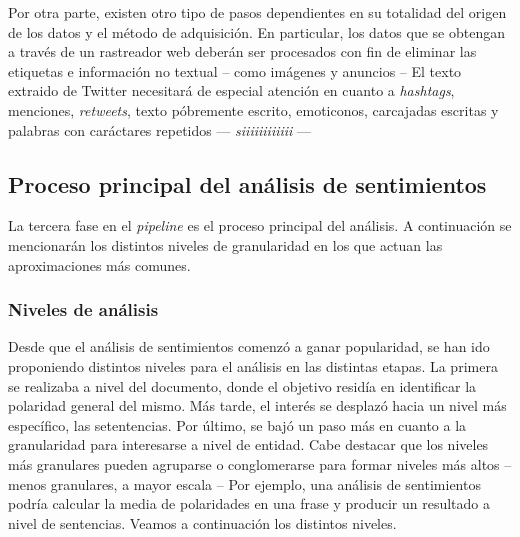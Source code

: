 Por otra parte, existen otro tipo de pasos dependientes en su totalidad del
origen de los datos y el método de adquisición. En particular, los datos que se
obtengan a través de un rastreador web deberán ser procesados con fin de
eliminar las etiquetas  e información no textual -- como
imágenes y anuncios -- El texto extraido de Twitter necesitará de especial
atención en cuanto a \emph{hashtags}, menciones, \emph{retweets}, texto
póbremente escrito, emoticonos, carcajadas escritas y palabras con caráctares
repetidos --- \emph{siiiiiiiiiiii} ---

\subsection{Proceso principal del análisis de sentimientos}
\label{sec:omcore}

La tercera fase en el \emph{pipeline} es el proceso principal del análisis. A
continuación se mencionarán los distintos niveles de granularidad en los que
actuan las aproximaciones más comunes.

\subsubsection{Niveles de análisis}
\label{sec:anallevels}

Desde que el análisis de sentimientos comenzó a ganar popularidad, se han ido
proponiendo distintos niveles para el análisis en las distintas etapas. La
primera se realizaba a nivel del documento, donde el objetivo residía en
identificar la polaridad general del mismo. Más tarde, el interés se desplazó
hacia un nivel más específico, las setentencias. Por último, se bajó un paso más
en cuanto a la granularidad para interesarse a nivel de entidad. Cabe destacar
que los niveles más granulares pueden agruparse o conglomerarse para formar
niveles más altos -- menos granulares, a mayor escala -- Por ejemplo, una
análisis de sentimientos podría calcular la media de polaridades en una frase y
producir un resultado a nivel de sentencias. Veamos a continuación los distintos
niveles.

